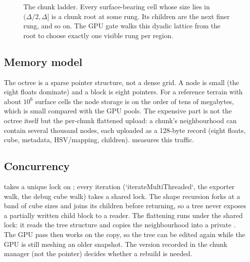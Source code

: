 \begin{figure}[htbp]
\centering
{}
\caption{The chunk ladder.  Every surface-bearing cell whose size lies in
$(\Delta/2,\Delta]$ is a chunk root at some rung.  Its children are the
next finer rung, and so on.  The GPU gate walks this dyadic lattice from
the root to choose exactly one visible rung per region.}
\label{fig:ladder}
\end{figure}

\subsection{Memory model}

The octree is a sparse pointer structure, not a dense grid.  A node is
small (the eight floats dominate) and a block is eight pointers.  For a
reference terrain with about $10^6$ surface cells the node storage is on
the order of tens of megabytes, which is small compared with the GPU
pools.  The expensive part is not the octree itself but the per-chunk
flattened upload: a chunk's neighbourhood can contain several thousand
nodes, each uploaded as a 128-byte record (eight floats, cube, metadata,
HSV/mapping, children).   measures this traffic.

\subsection{Concurrency}

 takes a unique lock on ; every
iteration (`iterateMultiThreaded`, the exporter walk, the debug cube walk)
takes a shared lock.  The shape recursion forks at a band of cube sizes and
joins its children before returning, so a tree never exposes a partially
written child block to a reader.  The flattening runs under the shared
lock: it reads the tree structure and copies the neighbourhood into a
private .  The GPU pass then works on the copy,
so the tree can be edited again while the GPU is still meshing an older
snapshot.  The version recorded in the chunk manager (not the pointer)
decides whether a rebuild is needed.
